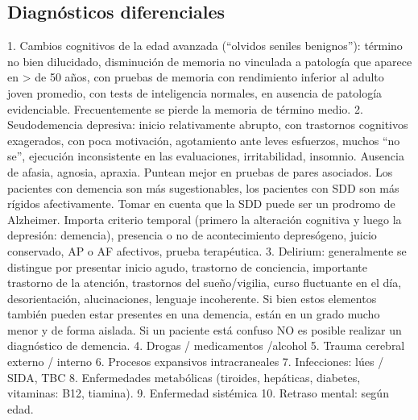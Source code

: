\documentclass{scrbook}
\begin{document}
\subsection*{Diagnósticos diferenciales}
1. Cambios cognitivos de la edad avanzada (“olvidos seniles benignos”): término no bien dilucidado, disminución de memoria no vinculada a patología que aparece en > de 50 años, con pruebas de memoria con rendimiento inferior al adulto joven promedio, con tests de inteligencia normales, en ausencia de patología evidenciable. Frecuentemente se pierde la memoria de término medio.
2. Seudodemencia depresiva: inicio relativamente abrupto, con trastornos cognitivos exagerados, con poca motivación, agotamiento ante leves esfuerzos, muchos “no se”, ejecución inconsistente en las evaluaciones, irritabilidad, insomnio. Ausencia de afasia, agnosia, apraxia. Puntean mejor en pruebas de pares asociados. Los pacientes con demencia son más sugestionables, los pacientes con SDD son más rígidos afectivamente. Tomar en cuenta que la SDD puede ser un prodromo de Alzheimer. Importa criterio temporal (primero la alteración cognitiva y luego la depresión: demencia), presencia o no de acontecimiento depresógeno, juicio conservado, AP o AF afectivos, prueba terapéutica.
3. Delirium: generalmente se distingue por presentar inicio agudo, trastorno de conciencia, importante trastorno de la atención, trastornos del sueño/vigilia, curso fluctuante en el día, desorientación, alucinaciones, lenguaje incoherente. Si bien estos elementos también pueden estar presentes en una demencia, están en un grado mucho menor y de forma aislada. Si un paciente está confuso NO es posible realizar un diagnóstico de demencia.
4. Drogas / medicamentos /alcohol
5. Trauma cerebral externo / interno
6. Procesos expansivos intracraneales
7. Infecciones: lúes / SIDA, TBC
8. Enfermedades metabólicas (tiroides, hepáticas, diabetes, vitaminas: B12, tiamina).
9. Enfermedad sistémica
10. Retraso mental: según edad.
\end{document}
